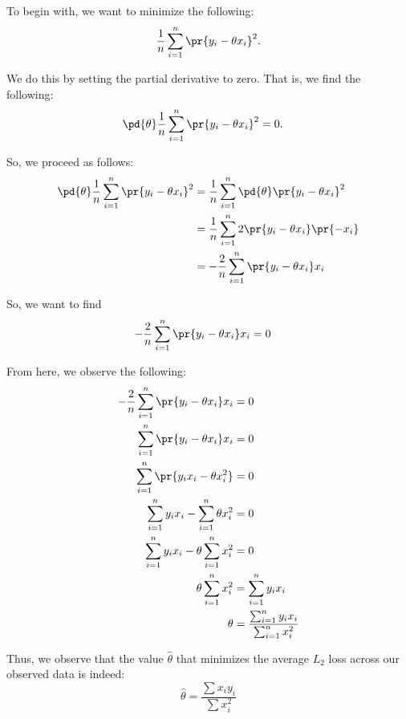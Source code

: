 \documentclass{article}
\begin{document}
\begin{solution}
	To begin with, we want to minimize the following:
	\begin{equation*}
		\frac{1}{n} \sum_{i=1}^{n} \pr{y_{i} - \theta x_{i}}^{2}.
	\end{equation*}

	We do this by setting the partial derivative to zero. That is, we find the following:
	\begin{align*}
		\pd{\theta} \frac{1}{n} \sum_{i=1}^{n} \pr{y_{i} - \theta x_{i}}^{2} &= 0.
	\end{align*}

	So, we proceed as follows:
	\begin{align*}
			\pd{\theta} \frac{1}{n} \sum_{i=1}^{n} \pr{y_{i} - \theta x_{i}}^{2} &= \frac{1}{n} \sum_{i=1}^{n} \pd{\theta} \pr{y_{i} - \theta x_{i}}^{2} \\
			&= \frac{1}{n} \sum_{i=1}^{n} 2\pr{y_{i} - \theta x_{i}}\pr{-x_{i}} \\
			&= -\frac{2}{n} \sum_{i=1}^{n} \pr{y_{i} - \theta x_{i}}x_{i}
	\end{align*}

	So, we want to find
	\begin{align*}
		-\frac{2}{n} \sum_{i=1}^{n} \pr{y_{i} - \theta x_{i}}x_{i} &= 0
	\end{align*}

	From here, we observe the following:
	\begin{align*}
		-\frac{2}{n} \sum_{i=1}^{n} \pr{y_{i} - \theta x_{i}}x_{i} &= 0 \\
		\sum_{i=1}^{n} \pr{y_{i} - \theta x_{i}}x_{i} &= 0 \\
		\sum_{i=1}^{n} \pr{y_{i}x_{i} - \theta x_{i}^{2}} &= 0 \\
		\sum_{i=1}^{n} y_{i}x_{i} - \sum_{i=1}^{n} \theta x_{i}^{2} &= 0 \\
		\sum_{i=1}^{n} y_{i}x_{i} - \theta \sum_{i=1}^{n} x_{i}^{2} &= 0 \\
		\theta\sum_{i=1}^{n} x_{i}^{2} &= \sum_{i=1}^{n} y_{i}x_{i} \\
		\theta &= \frac{\sum_{i=1}^{n} y_{i}x_{i}}{\sum_{i=1}^{n} x_{i}^{2}}
	\end{align*} 

	Thus, we observe that the value $\hat{\theta}$ that minimizes the average $L_{2}$ loss across our observed data is indeed:
	\begin{equation*}
		\hat\theta = \frac{\sum x_{i} y_{i}}{\sum x_{i}^{2}}
	\end{equation*}
\end{solution}
\end{document}
